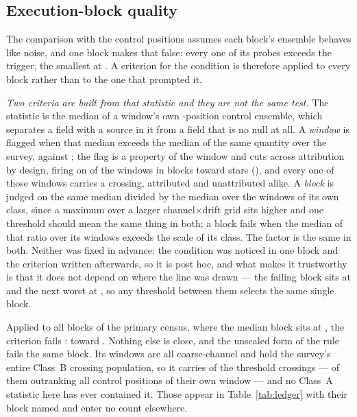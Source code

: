 \subsection{Execution-block quality}
\label{sec:blockquality}

The comparison with the control positions assumes each block's ensemble
behaves like noise, and one block makes that false: every one of its \NCtrl{}
probes exceeds the trigger, the smallest at \BqFailCtrlMin. A criterion for
the condition is therefore applied to every block rather than to the one that
prompted it.

\emph{Two criteria are built from that statistic and they are not the same
test.} The statistic is the median of a window's own \NCtrl-position control
ensemble, which separates a field with a source in it from a field that is no
null at all. A \emph{window} is flagged when that median exceeds \BqFactor{}
the median of the same quantity over the survey, \DqThresh{} against
\DqSurvMed; the flag is a property of the window and cuts across attribution
by design, firing on \DqNWin{} of the \NWindows{} windows in
\BkFlagNBlock{} blocks toward \DqNStar{} stars (\DqStars), and every one of
those windows carries a crossing, attributed and unattributed alike. A
\emph{block} is judged on the same median divided by the median over the
windows of its own class, since a maximum over a larger
channel$\times$drift grid sits higher and one threshold should mean the same
thing in both; a block fails when the median of that ratio over its windows
exceeds \BqFactor{} the scale of its class. The factor is the same in
both. Neither was fixed in advance: the condition
was noticed in one block and the criterion written afterwards, so it is post
hoc, and what makes it trustworthy is that it does not depend on where the
line was drawn --- the failing block sits at \BqFailQ{} and the next worst at
\BqNextQ, so any threshold between them selects the same single block.

Applied to all \BqNBlocks{} blocks of the primary census, where the median
block sits at \BqQMed, the criterion fails \BqNFail: \BqFailBlock{} toward
\BqFailStar. Nothing else is close, and the unscaled form of the rule fails
the same \BqRawNFail{} block. Its \BqFailNWin{} windows are all coarse-channel and
hold the survey's entire Class~B crossing population, so it carries
\EvNCrossFlag{} of the \EvNCrossRaw{} threshold crossings --- \EvNRankFlag{}
of them outranking all \NCtrl{} control positions of their own window --- and
no Class~A statistic here has ever contained it. Those \EvNCrossFlag{} appear
in Table~\ref{tab:ledger} with their block named and enter no count
elsewhere.

